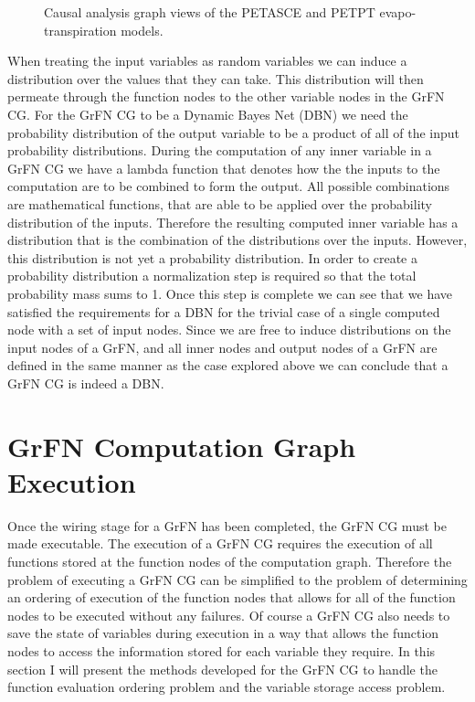 \FloatBarrier
\begin{figure}[!htbp]
    \label{cag_viz}
    \centering
    \caption[CAG Visualizations]{Causal analysis graph views of the PETASCE and PETPT evapo-transpiration models.}
\end{figure}
\FloatBarrier

When treating the input variables as random variables we can induce a distribution over the values that they can take.
This distribution will then permeate through the function nodes to the other variable nodes in the GrFN CG.
For the GrFN CG to be a Dynamic Bayes Net (DBN) we need the probability distribution of the output variable to be a product of all of the input probability distributions.
During the computation of any inner variable in a GrFN CG we have a lambda function that denotes how the the inputs to the computation are to be combined to form the output.
All possible combinations are mathematical functions, that are able to be applied over the probability distribution of the inputs.
Therefore the resulting computed inner variable has a distribution that is the combination of the distributions over the inputs.
However, this distribution is not yet a probability distribution.
In order to create a probability distribution a normalization step is required so that the total probability mass sums to 1.
Once this step is complete we can see that we have satisfied the requirements for a DBN for the trivial case of a single computed node with a set of input nodes.
Since we are free to induce distributions on the input nodes of a GrFN, and all inner nodes and output nodes of a GrFN are defined in the same manner as the case explored above we can conclude that a GrFN CG is indeed a DBN.

\section{GrFN Computation Graph Execution\label{sec:cg_execution}}
Once the wiring stage for a GrFN has been completed, the GrFN CG must be made executable. The execution of a GrFN CG requires the execution of all functions stored at the function nodes of the computation graph. Therefore the problem of executing a GrFN CG can be simplified to the problem of determining an ordering of execution of the function nodes that allows for all of the function nodes to be executed without any failures. Of course a GrFN CG also needs to save the state of variables during execution in a way that allows the function nodes to access the information stored for each variable they require. In this section I will present the methods developed for the GrFN CG to handle the function evaluation ordering problem and the variable storage access problem.

